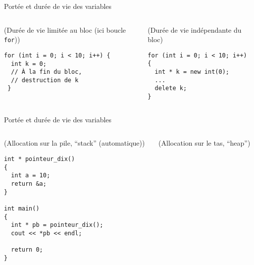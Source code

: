 \documentclass[c]{beamer}
\begin{document}
\begin{frame}[fragile]{Portée et durée de vie des variables}
 \begin{columns}
\begin{column}{0.6\columnwidth}
\begin{cbox}[][lwuc][\footnotesize](Durée de vie limitée au bloc (ici boucle \texttt{for}))
\begin{verbatim}
for (int i = 0; i < 10; i++) {
  int k = 0;
  // À la fin du bloc,
  // destruction de k
 }
\end{verbatim}
\end{cbox}
\end{column}

\begin{column}{0.6\columnwidth}
\begin{cbox}[][lwuc][\footnotesize](Durée de vie indépendante du bloc)
\begin{verbatim}
for (int i = 0; i < 10; i++) {
  int * k = new int(0);
  ...
  delete k;
}
\end{verbatim}
\end{cbox}
\end{column}
\end{columns}
\end{frame}
\begin{frame}[fragile]{Portée et durée de vie des variables}
 \begin{columns}
\begin{column}{0.7\columnwidth}
\begin{cbox}[][lwuc][\footnotesize](Allocation sur la pile, “stack” (automatique))
\begin{verbatim}
int * pointeur_dix()
{
  int a = 10;
  return &a;
}

int main()
{
  int * pb = pointeur_dix();
  cout << *pb << endl;

  return 0;
}
\end{verbatim}
\end{cbox}
\end{column}

\begin{column}{0.6\columnwidth}
\begin{cbox}[][hidden][\footnotesize](Allocation sur le tas, “heap”)
\end{cbox}
\end{column}
\end{columns}
\end{frame}
\end{document}
